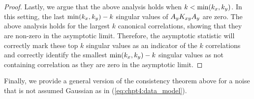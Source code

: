 \begin{proof}
Lastly, we argue that the above analysis holds when $k<\min(k_x,k_y)$. In this setting,
the last $\min(k_x,k_y)-k$ singular values of $A_yK_{xy} A_y$ are zero. The above
analysis holds for the largest $k$ canonical correlations, showing that they are non-zero
in the asymptotic limit. Therefore, the asymptotic statistic will correctly mark these top $k$
singular values as an indicator of the $k$ correlations and correctly identify the
smallest $\min(k_x,k_y)-k$ singular values as not containing correlation as they are zero
in the asymptotic limit.


\end{proof}


Finally, we provide a general version of the consistency theorem above for a noise that is
not assumed Gaussian as in (\ref{eq:chpt4:data_model}). 

